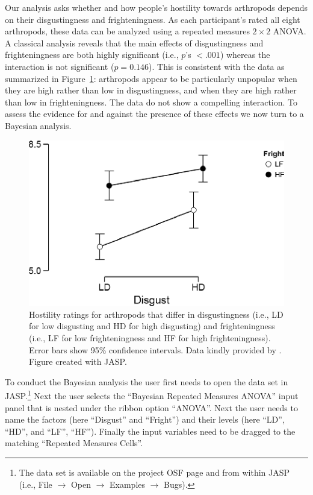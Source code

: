 Our analysis asks whether and how people's hostility towards arthropods depends on their disgustingness and frighteningness. As each participant's rated all eight arthropods, these data can be analyzed using a repeated measures $2\times2$ ANOVA. A classical analysis reveals that the main effects of disgustingness and frighteningness are both highly significant (i.e., $p$'s $< .001$) whereas the interaction is not significant ($p=0.146$). This is consistent with the data as summarized in Figure~\ref{fig:bi2:ArthropodDescriptivePlot}: arthropods appear to be particularly unpopular when they are high rather than low in disgustingness, and when they are high rather than low in frighteningness. The data do not show a compelling interaction. To assess the evidence for and against the presence of these effects we now turn to a Bayesian analysis.

\begin{figure}[tp]
    \begin{center}
        \includegraphics[width=.75\textwidth]{figs/bi2_ArthropodDescriptivePlot.eps}
        \caption{Hostility ratings for arthropods that differ in disgustingness (i.e., LD for low disgusting and HD for high disgusting) and frighteningness (i.e., LF for low frighteningness and HF for high frighteningness). Error bars show 95\% confidence intervals. Data kindly provided by \protect {}. Figure created with JASP.} \label{fig:bi2:ArthropodDescriptivePlot}
    \end{center}
\end{figure}

To conduct the Bayesian analysis the user first needs to open the data set in JASP.\footnote{The data set is available on the project OSF page and from within JASP (i.e., File $\rightarrow$ Open $\rightarrow$ Examples $\rightarrow$ Bugs).} Next the user selects the ``Bayesian Repeated Measures ANOVA'' input panel that is nested under the ribbon option ``ANOVA''. Next the user needs to name the factors (here ``Disgust'' and ``Fright'') and their levels (here ``LD'', ``HD'', and ``LF'', ``HF''). Finally the input variables need to be dragged to the matching ``Repeated Measures Cells''.

